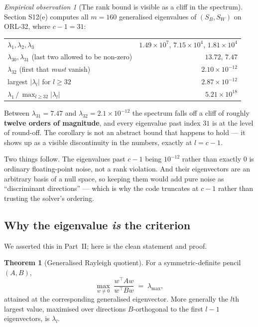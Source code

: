 \documentclass[11pt]{article}
\theoremstyle{definition}
\newtheorem{theorem}{Theorem}[section]
\theoremstyle{remark}
\newtheorem*{observation}{Empirical observation}
\newcommand{\Sw}{S_W}
\newcommand{\Sb}{S_B}
\begin{document}
\begin{observation}[The rank bound is visible as a cliff in the spectrum]
Section S12(e) computes all $m=160$ generalised eigenvalues of $(\Sb,\Sw)$ on
ORL-32, where $c-1 = 31$:
\begin{center}
\begin{tabular}{lr}
\toprule
$\lambda_1,\lambda_2,\lambda_3$ & $1.49\times10^{7}$, \; $7.15\times10^{4}$, \; $1.81\times10^{4}$ \\
$\lambda_{30}, \lambda_{31}$ \;(last two allowed to be non-zero) & $13.72$, \; $7.47$ \\
$\lambda_{32}$ \;(first that \emph{must} vanish) & $2.10\times10^{-12}$ \\
largest $|\lambda_l|$ for $l \ge 32$ & $2.87\times10^{-12}$ \\
\midrule
$\lambda_1 \,/\, \max_{l\ge32}|\lambda_l|$ & $5.21\times10^{18}$ \\
\bottomrule
\end{tabular}
\end{center}
Between $\lambda_{31}=7.47$ and $\lambda_{32}=2.1\times10^{-12}$ the spectrum
falls off a cliff of roughly \textbf{twelve orders of magnitude}, and every
eigenvalue past index $31$ is at the level of round-off. The corollary is not an
abstract bound that happens to hold --- it shows up as a visible discontinuity in
the numbers, exactly at $l = c-1$.

Two things follow. The eigenvalues past $c-1$ being $10^{-12}$ rather than exactly
$0$ is ordinary floating-point noise, not a rank violation. And their
eigenvectors are an arbitrary basis of a null space, so keeping them would add
pure noise as ``discriminant directions'' --- which is why the code truncates at
$c-1$ rather than trusting the solver's ordering.
\end{observation}

\subsection{Why the eigenvalue \emph{is} the criterion}

We asserted this in Part~II; here is the clean statement and proof.

\begin{theorem}[Generalised Rayleigh quotient]
\label{thm:rayleigh}
For a symmetric-definite pencil $(A,B)$,
\[
  \max_{w\neq0}\; \frac{w^{\!\top}Aw}{w^{\!\top}Bw} \;=\; \lambda_{\max},
\]
attained at the corresponding generalised eigenvector. More generally the $l$th
largest value, maximised over directions $B$-orthogonal to the first $l-1$
eigenvectors, is $\lambda_l$.
\end{theorem}
\end{document}
